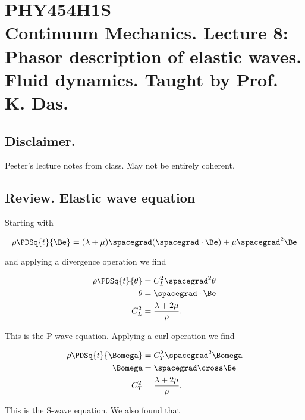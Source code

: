 
%

\chapter{PHY454H1S\\Continuum Mechanics.  Lecture 8: Phasor description of elastic waves.  Fluid dynamics.  Taught by Prof. K. Das.}
\label{chap:continuumL8}
{}
\date{Feb 3, 2012}

\beginArtWithToc

\section{Disclaimer.}

Peeter's lecture notes from class.  May not be entirely coherent.

\section{Review.  Elastic wave equation}

Starting with

\begin{equation}\label{eqn:continuumL8:n}
\rho \PDSq{t}{\Be} = (\lambda + \mu) \spacegrad (\spacegrad \cdot \Be) + \mu \spacegrad^2 \Be
\end{equation}

and applying a divergence operation we find

\begin{align}\label{eqn:continuumL8:n}
\rho \PDSq{t}{\theta} &= C_L^2 \spacegrad^2 \theta \\
\theta &= \spacegrad \cdot \Be \\
C_L^2 &= \frac{\lambda + 2\mu}{\rho}.
\end{align}

This is the P-wave equation.  Applying a curl operation we find

\begin{align}\label{eqn:continuumL8:n}
\rho \PDSq{t}{\Bomega} &= C_T^2 \spacegrad^2 \Bomega \\
\Bomega &= \spacegrad \cross \Be \\
C_T^2 &= \frac{\lambda + 2\mu}{\rho}.
\end{align}

This is the S-wave equation.  We also found that

